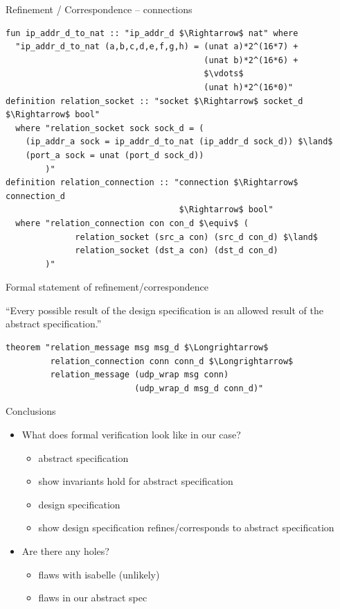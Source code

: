 \documentclass{beamer}
\begin{document}
\begin{frame}[fragile]{Refinement / Correspondence -- connections}
    \begin{lstlisting}[language=isabelle]
fun ip_addr_d_to_nat :: "ip_addr_d $\Rightarrow$ nat" where
  "ip_addr_d_to_nat (a,b,c,d,e,f,g,h) = (unat a)*2^(16*7) +
                                        (unat b)*2^(16*6) +
                                        $\vdots$
                                        (unat h)*2^(16*0)"
definition relation_socket :: "socket $\Rightarrow$ socket_d $\Rightarrow$ bool"
  where "relation_socket sock sock_d = (
    (ip_addr_a sock = ip_addr_d_to_nat (ip_addr_d sock_d)) $\land$
    (port_a sock = unat (port_d sock_d))
        )"
definition relation_connection :: "connection $\Rightarrow$ connection_d
                                   $\Rightarrow$ bool"
  where "relation_connection con con_d $\equiv$ (
              relation_socket (src_a con) (src_d con_d) $\land$
              relation_socket (dst_a con) (dst_d con_d)
        )"
    \end{lstlisting}
\end{frame}

\begin{frame}[fragile]{Formal statement of refinement/correspondence}

``Every possible result of the design specification is an allowed result of the abstract specification.''

    \begin{lstlisting}[language=isabelle]
theorem "relation_message msg msg_d $\Longrightarrow$
         relation_connection conn conn_d $\Longrightarrow$
         relation_message (udp_wrap msg conn)
                          (udp_wrap_d msg_d conn_d)"
    \end{lstlisting}
\end{frame}

\begin{frame}{Conclusions}
    \begin{itemize}
        \item What does formal verification look like in our case?
        \begin{itemize}
            \item abstract specification
            \item show invariants hold for abstract specification
            \item design specification
            \item show design specification refines/corresponds to abstract specification
        \end{itemize}
        \item Are there any holes?
        \begin{itemize}
            \item flaws with isabelle (unlikely)
            \item flaws in our abstract spec
        \end{itemize}
    \end{itemize}
\end{frame}
\end{document}
